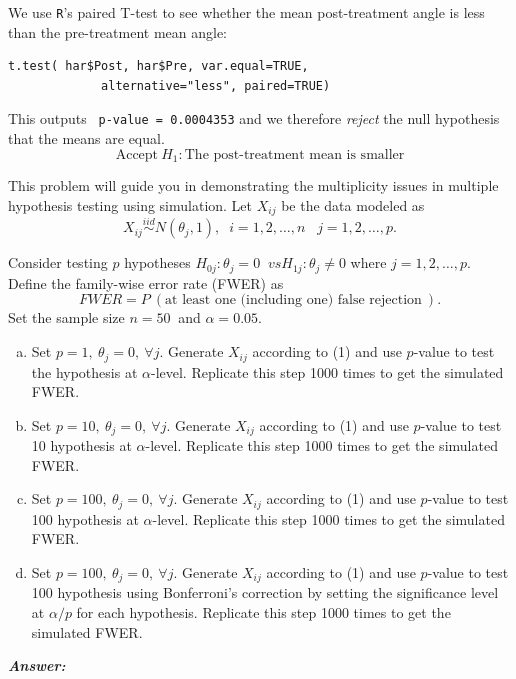 \documentclass[12pt]{article}
\newenvironment{question}[2][Question]{\begin{trivlist}
\item[\hskip \labelsep {\bfseries #1}\hskip \labelsep {\bfseries #2.}]}{\end{trivlist}}
\begin{document}

We use \texttt{R}'s paired T-test to see whether the mean post-treatment
angle is less than the pre-treatment mean angle:
\begin{verbatim}
t.test( har$Post, har$Pre, var.equal=TRUE, 
             alternative="less", paired=TRUE)
\end{verbatim}

This outputs \texttt{ p-value = 0.0004353} and we therefore \emph{reject} the null hypothesis that the means are equal.
\bigskip
$$
\boxed{ \text{ Accept} \ H_1: \text{The post-treatment mean is smaller } }
$$
 

\bigskip
\bigskip
 \begin{question}{7.3}This problem will guide you in demonstrating the multiplicity issues in multiple hypothesis testing using simulation. Let $X_{ij}$ be the data modeled as
\begin{equation}
X_{ij} \stackrel{iid}{\sim} N( \theta_j, 1 ), \; \; i = 1, 2, \dots , n \; \; \; j = 1,2,\dots, p.
\end{equation}

Consider testing $p$ hypotheses $H_{0j} : \theta_j = 0 \; \; vs H_{1j} : \theta_j \neq 0$ where $j = 1, 2, \dots, p$. Define the family-wise error rate (FWER) as
$$
FWER = P\ ( \text{at least one (including one) false rejection} \ ).
$$
Set the sample size $n = 50\ $ and $\alpha = 0.05$.
\begin{enumerate}[(a)]
\item Set $p = 1, \ \theta_j = 0,\  \forall j$. Generate $X_{ij}$ according to (1) and use $p$-value to test the hypothesis at $\alpha$-level. Replicate this step 1000 times to get the simulated FWER.
\item  Set $p = 10, \ \theta_j = 0,\  \forall j$. Generate $X_{ij}$ according to (1) and use $p$-value to test 10 hypothesis at $\alpha$-level. Replicate this step 1000 times to get the simulated FWER.
\item  Set $p = 100, \ \theta_j = 0, \ \forall j$. Generate $X_{ij}$ according to (1) and use $p$-value to test 100 hypothesis at $\alpha$-level. Replicate this step 1000 times to get the simulated FWER.
\item  Set $p = 100, \ \theta_j = 0, \ \forall j$. Generate $X_{ij}$ according to (1) and use $p$-value to test 100 hypothesis using Bonferroni's correction by setting the significance level at $\alpha / p$ for each hypothesis.  Replicate this step 1000 times to get the simulated FWER.

\end{enumerate}

\end{question} 
  \textbf{\color{TealBlue}\emph{Answer:} } 
  \bigskip
  
\end{document}
